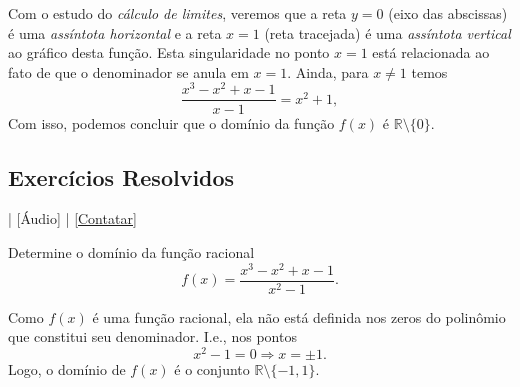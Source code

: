 Com o estudo do \emph{cálculo de limites}, veremos que a reta $y = 0$ (eixo das abscissas) é uma \emph{assíntota horizontal} e a reta $x=1$ (reta tracejada) é uma \emph{assíntota vertical} ao gráfico desta função. Esta singularidade no ponto $x=1$ está relacionada ao fato de que o denominador se anula em $x=1$. Ainda, para $x\neq 1$ temos
\begin{equation}
  \frac{x^3 - x^2 + x - 1}{x-1} = x^2 + 1,
\end{equation}
Com isso, podemos concluir que o domínio da função $f(x)$ é $\mathbb{R}\setminus\{0\}$.


\subsection*{Exercícios Resolvidos}

\begin{flushright}
  [Vídeo] | [Áudio] | \href{https://phkonzen.github.io/notas/contato.html}{[Contatar]}
\end{flushright}

\begin{exeresol}
  Determine o domínio da função racional
  \begin{equation}
    f(x) = \frac{x^3-x^2+x-1}{x^2-1}.
  \end{equation}
\end{exeresol}
\begin{resol}
  Como $f(x)$ é uma função racional, ela não está definida nos zeros do polinômio que constitui seu denominador. I.e., nos pontos
  \begin{equation}
    x^2-1=0\Rightarrow x = \pm 1.
  \end{equation}
  Logo, o domínio de $f(x)$ é o conjunto $\mathbb{R}\setminus\{-1, 1\}$.
\end{resol}

